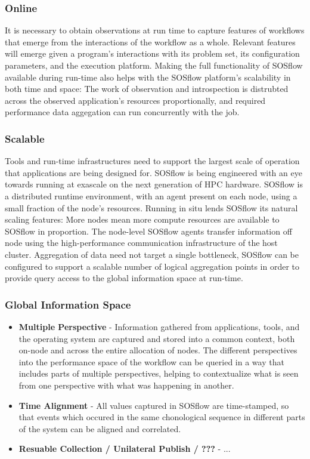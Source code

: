 \subsubsection{Online}
%
It is necessary to obtain observations at run time to capture features
of workflows that emerge from the interactions of the workflow as a
whole.
%
Relevant features will emerge given a program's interactions
with its problem set, its configuration parameters, and the execution platform.
%
Making the full functionality of SOSflow available during run-time
also helps with the SOSflow platform's scalability in both time and
space: The work of observation and introspection is distrubted across
the observed application's resources proportionally, and required
performance data aggegation can run concurrently with the job.
%
\subsubsection{Scalable}
%
Tools and run-time infrastructures need to support the largest scale of
operation that applications are being designed for.
%
SOSflow is being engineered with an eye towards running at exascale
on the next generation of HPC hardware.
%
SOSflow is a distributed runtime environment, with an agent present
on each node, using a small fraction of the node's resources.
%
Running in situ lends SOSflow its natural scaling features: More nodes
mean more compute resources are available to SOSflow in proportion.
%
The node-level SOSflow agents transfer information off node using
the high-performance communication infrastructure of the host cluster.
%
Aggregation of data need not target a single bottleneck, SOSflow can
be configured to support a scalable number of logical aggregation points
in order to provide query access to the global information space at
run-time.
%
\subsubsection{Global Information Space}
     \begin{itemize}
        \item \textbf{Multiple Perspective} - Information gathered from
          applications, tools, and the operating system are captured
          and stored into a common context, both on-node and across
          the entire allocation of nodes.  The different perspectives
          into the performance space of the workflow can be queried
          in a way that includes parts of multiple perspectives,
          helping to contextualize what is seen from one perspective
          with what was happening in another.
        \item \textbf{Time Alignment} - All values captured in SOSflow
          are time-stamped, so that events which occured in the same
          chonological sequence in different parts of the system can be
          aligned and correlated.
        \item \textbf{Resuable Collection / Unilateral Publish / ???} - ...
     \end{itemize}


